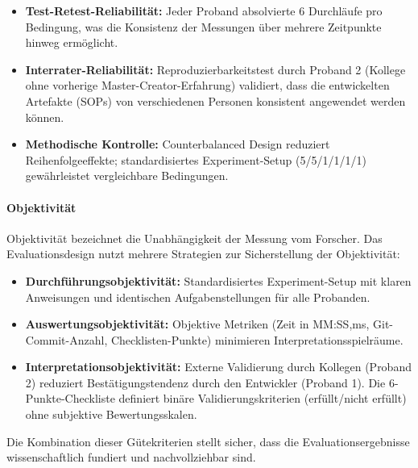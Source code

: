 \begin{itemize}
    \item \textbf{Test-Retest-Reliabilität:} Jeder Proband absolvierte 6 Durchläufe pro Bedingung, was die Konsistenz der Messungen über mehrere Zeitpunkte hinweg ermöglicht.

    \item \textbf{Interrater-Reliabilität:} Reproduzierbarkeitstest durch Proband 2 (Kollege ohne vorherige Master-Creator-Erfahrung) validiert, dass die entwickelten Artefakte (SOPs) von verschiedenen Personen konsistent angewendet werden können.

    \item \textbf{Methodische Kontrolle:} Counterbalanced Design reduziert Reihenfolgeeffekte; standardisiertes Experiment-Setup (5/5/1/1/1/1) gewährleistet vergleichbare Bedingungen.
\end{itemize}

\paragraph{Objektivität}

Objektivität bezeichnet die Unabhängigkeit der Messung vom Forscher. Das Evaluationsdesign nutzt mehrere Strategien zur Sicherstellung der Objektivität:

\begin{itemize}
    \item \textbf{Durchführungsobjektivität:} Standardisiertes Experiment-Setup mit klaren Anweisungen und identischen Aufgabenstellungen für alle Probanden.

    \item \textbf{Auswertungsobjektivität:} Objektive Metriken (Zeit in MM:SS,ms, Git-Commit-Anzahl, Checklisten-Punkte) minimieren Interpretationsspielräume.

    \item \textbf{Interpretationsobjektivität:} Externe Validierung durch Kollegen (Proband 2) reduziert Bestätigungstendenz durch den Entwickler (Proband 1). Die 6-Punkte-Checkliste definiert binäre Validierungskriterien (erfüllt/nicht erfüllt) ohne subjektive Bewertungsskalen.
\end{itemize}

Die Kombination dieser Gütekriterien stellt sicher, dass die Evaluationsergebnisse wissenschaftlich fundiert und nachvollziehbar sind.
